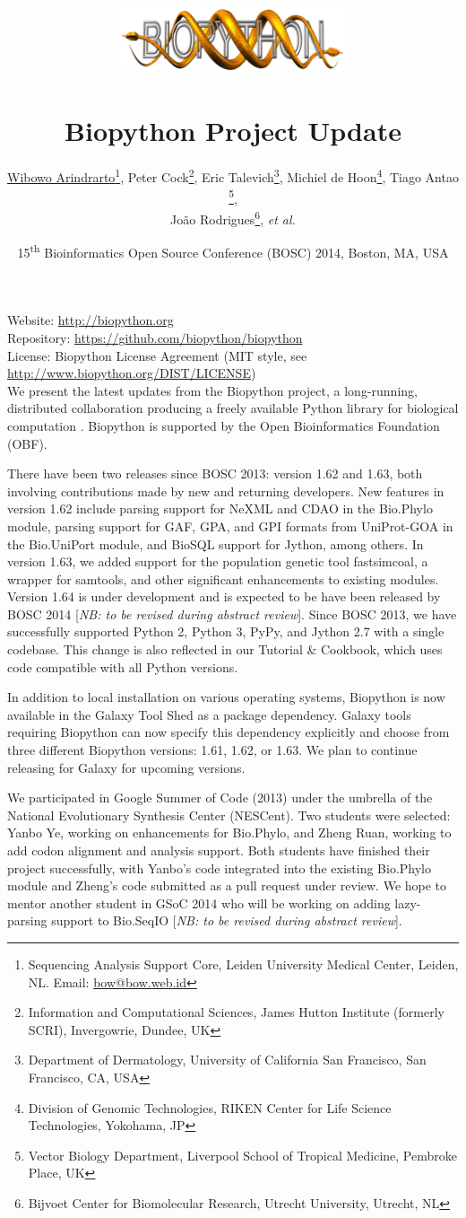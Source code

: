 \documentclass[10pt,oneside]{article}
\title{%
\vspace{-1.5in}
\includegraphics[width=0.5\textwidth]{biopython.jpg}\\
~\\Biopython Project Update}
\author{
    \underline{Wibowo Arindrarto}\footnote{Sequencing Analysis Support Core, Leiden University Medical Center, Leiden, NL. Email: \href{mailto:bow@bow.web.id}{bow@bow.web.id}},
    Peter Cock\footnote{Information and Computational Sciences, James Hutton Institute (formerly SCRI), Invergowrie, Dundee, UK},
    Eric Talevich\footnote{Department of Dermatology, University of California San Francisco, San Francisco, CA, USA},
    Michiel de Hoon\footnote{Division of Genomic Technologies, RIKEN Center for Life Science Technologies, Yokohama, JP},
    Tiago Antao \footnote{Vector Biology Department, Liverpool School of Tropical Medicine, Pembroke Place, UK},
    \\
    Jo\~{a}o Rodrigues\footnote{Bijvoet Center for Biomolecular Research, Utrecht University, Utrecht, NL},
    \textit{et al.}}
\date{15\textsuperscript{th} Bioinformatics Open Source Conference (BOSC) 2014, Boston, MA, USA}
\begin{document}
\maketitle
\thispagestyle{empty}

\vspace{-0.2in}
\noindent
Website: \url{http://biopython.org} \\
Repository: \url{https://github.com/biopython/biopython} \\
License: Biopython License Agreement (MIT style, see \url{http://www.biopython.org/DIST/LICENSE}) \\

We present the latest updates from the Biopython project, a long-running,
distributed collaboration producing a freely available Python library for
biological computation \citep{AppNote}. Biopython is supported by the Open
Bioinformatics Foundation (OBF).

There have been two releases since BOSC 2013: version 1.62 and 1.63, both
involving contributions made by new and returning developers. New features
in version 1.62 include parsing support for NeXML and CDAO in the Bio.Phylo
module, parsing support for GAF, GPA, and GPI formats from UniProt-GOA
in the Bio.UniPort module, and BioSQL support for Jython, among others.
In version 1.63, we added  support for the population genetic tool
fastsimcoal, a wrapper for samtools, and other significant enhancements to
existing modules. Version 1.64 is under development and is expected to be
have been released by BOSC 2014 [{\it NB: to be revised during abstract review}].
Since BOSC 2013, we have successfully supported Python 2, Python 3, PyPy, and
Jython 2.7 with a single codebase. This change is also reflected in our Tutorial
\& Cookbook, which uses code compatible with all Python versions.

In addition to local installation on various operating systems, Biopython
is now available in the Galaxy Tool Shed \citep{ToolShed} as a package
dependency. Galaxy tools requiring Biopython can now specify this dependency
explicitly and choose from three different Biopython versions: 1.61, 1.62, or
1.63. We plan to continue releasing for Galaxy for upcoming versions.

We participated in Google Summer of Code (2013) under the umbrella of the
National Evolutionary Synthesis Center (NESCent). Two students were selected:
Yanbo Ye, working on enhancements for Bio.Phylo, and Zheng Ruan, working to add
codon alignment and analysis support. Both students have finished their project
successfully, with Yanbo's code integrated into the existing Bio.Phylo module
and Zheng's code submitted as a pull request under review. We hope to mentor
another student in GSoC 2014 who will be working on adding lazy-parsing support
to Bio.SeqIO [{\it NB: to be revised during abstract review}].
\end{document}
